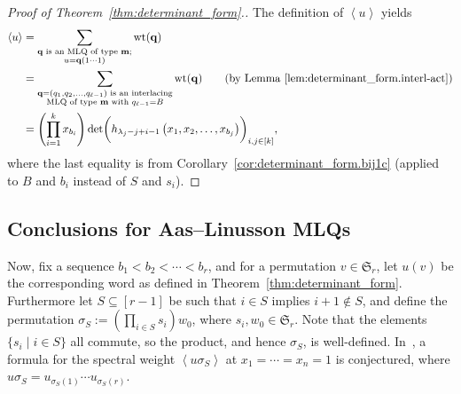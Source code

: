 \documentclass[reqno]{amsart}
\newcommand{\0}{\phantom{c}}
\newcommand{\swt}[1]{\left\langle #1 \right\rangle} %
\newcommand{\SymGp}[1]{\mathfrak{S}_{#1}} %
\DeclareMathOperator{\wt}{wt} %
\newcommand{\mm}{\mathbf{m}}
\newcommand{\qq}{\mathbf{q}}
\let\sumnonlimits\sum
\let\prodnonlimits\prod
\renewcommand{\sum}{\sumnonlimits\limits}
\renewcommand{\prod}{\prodnonlimits\limits}
\newcommand{\tup}[1]{\left( #1 \right)}
\newcommand{\ive}[1]{\left[ #1 \right]}
\theoremstyle{plain}
\theoremstyle{definition}
\numberwithin{equation}{section}
\begin{document}
\begin{proof}[Proof of Theorem~\ref{thm:determinant_form}.]
The definition of $\swt{u}$ yields
\begin{align*}
\swt{u} & = \sum_{\substack{\qq \text{ is an MLQ of type } \mm; \\ u=\qq(1\dotsm 1)}}\wt(\qq) \\
&  = \sum_{\substack{\qq = \tup{q_1, q_2, \dotsc, q_{\ell-1}} \text{ is an interlacing} \\\text{MLQ of type } \mm \text{ with } q_{\ell-1}=B}} \wt(\qq) \qquad \text{(by Lemma~\ref{lem:determinant_form.interl-act})} \\
&  = \left(  \prod_{i=1}^k x_{b_i} \right) \det\biggl( h_{\lambda_j-j+i-1}\left(x_1,x_2,\ldots,x_{b_j}\right)  \biggr)_{i, j \in \ive{k}} ,
\end{align*}
where the last equality is from Corollary~\ref{cor:determinant_form.bij1c} (applied to $B$ and $b_i$ instead of $S$ and $s_i$).
\end{proof}


\subsection{Conclusions for Aas--Linusson MLQs}

Now, fix a sequence $b_1 < b_2 < \cdots < b_r$, and for a permutation $v \in \SymGp{r}$, let $u(v)$ be the corresponding word as defined in Theorem~\ref{thm:determinant_form}.
Furthermore let $S \subseteq \ive{r-1}$ be such that $i\in S$ implies $i+1 \notin S$, and define the permutation $\sigma_S := \left( \prod_{i \in S} s_i \right) w_0$, where $s_i, w_0 \in \SymGp{r}$.
Note that the elements $\{s_i \mid i \in S\}$ all commute, so the product, and hence $\sigma_S$, is well-defined.
In~\cite[Conj.~3.10]{AasLin17}, a formula for the spectral weight $\swt{u \sigma_S}$ at $x_1 = \cdots = x_n = 1$ is conjectured, where $u \sigma_S = u_{\sigma_S(1)} \cdots u_{\sigma_S(r)}$.
\end{document}
